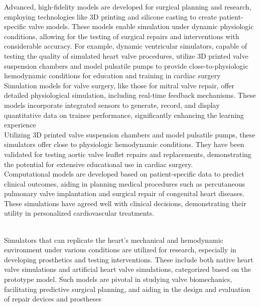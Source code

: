 Advanced, high-fidelity models are developed for surgical planning and research, employing technologies like 3D printing and silicone casting to create patient-specific valve models. These models enable simulation under dynamic physiologic conditions, allowing for the testing of surgical repairs and interventions with considerable accuracy. For example, dynamic ventricular simulators, capable of testing the quality of simulated heart valve procedures, utilize 3D printed valve suspension chambers and model pulsatile pumps to provide close-to-physiologic hemodynamic conditions for education and training in cardiac surgery ~\\

Simulation models for valve surgery, like those for mitral valve repair, offer detailed physiological simulation, including real-time feedback mechanisms. These models incorporate integrated sensors to generate, record, and display quantitative data on trainee performance, significantly enhancing the learning experience ~\\

Utilizing 3D printed valve suspension chambers and model pulsatile pumps, these simulators offer close to physiologic hemodynamic conditions. They have been validated for testing aortic valve leaflet repairs and replacements, demonstrating the potential for extensive educational use in cardiac surgery. ~\\

Computational models are developed based on patient-specific data to predict clinical outcomes, aiding in planning medical procedures such as percutaneous pulmonary valve implantation and surgical repair of congenital heart diseases. These simulations have agreed well with clinical decisions, demonstrating their utility in personalized cardiovascular treatments. ~

\\
Simulators that can replicate the heart's mechanical and hemodynamic environment under various conditions are utilized for research, especially in developing prosthetics and testing interventions. These include both native heart valve simulations and artificial heart valve simulations, categorized based on the prototype model. Such models are pivotal in studying valve biomechanics, facilitating predictive surgical planning, and aiding in the design and evaluation of repair devices and prostheses ~\\

